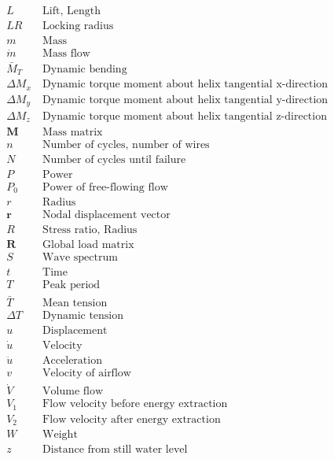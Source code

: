 \begin{align*}
L      &\ \text{Lift, Length}\\
LR      &\ \text{Locking radius}\\
m      &\ \text{Mass}\\
\dot{m}      &\ \text{Mass flow}\\
\bar{M}_T      &\ \text{Dynamic bending}\\
\Delta M_x      &\ \text{Dynamic torque moment about helix tangential x-direction }\\
\Delta M_y      &\ \text{Dynamic torque moment about helix tangential y-direction }\\
\Delta M_z      &\ \text{Dynamic torque moment about helix tangential z-direction }\\
\mathbf{M}      &\ \text{Mass matrix}\\
n      &\ \text{Number of cycles, number of wires}\\
N      &\ \text{Number of cycles until failure}\\
P      &\ \text{Power}\\
P_0      &\ \text{Power of free-flowing flow}\\
r      &\ \text{Radius}\\
\mathbf{r}      &\ \text{Nodal displacement vector}\\
R      &\ \text{Stress ratio, Radius}\\
\mathbf{R}      &\ \text{Global load matrix}\\
S      &\ \text{Wave spectrum}\\
t      &\ \text{Time}\\
T      &\ \text{Peak period}\\
\bar{T}  &\ \text{Mean tension}\\
\Delta T  &\ \text{Dynamic tension}\\
u      &\ \text{Displacement}\\
\dot{u}      &\ \text{Velocity}\\
\ddot{u}      &\ \text{Acceleration}\\
v      &\ \text{Velocity of airflow}\\
\dot{V} &\ \text{Volume flow}\\
V_1      &\ \text{Flow velocity before energy extraction}\\
V_2      &\ \text{Flow velocity after energy extraction}\\
W      &\ \text{Weight}\\
z      &\ \text{Distance from still water level}\\
\end{align*}


